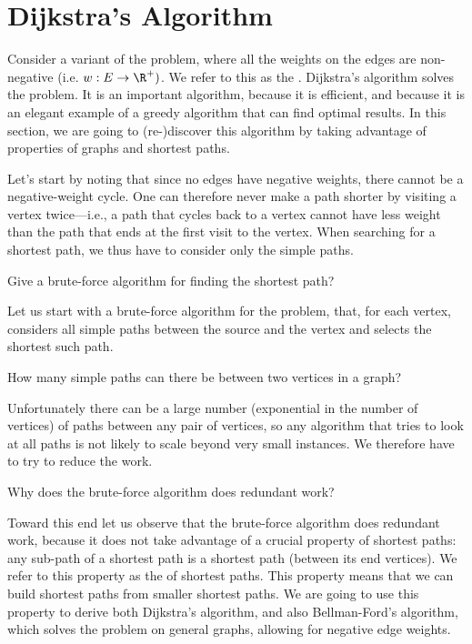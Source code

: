 \section{Dijkstra's Algorithm}

Consider a variant of the \sssp{} problem, where all the weights on
the edges are non-negative (i.e. $w : E \to \R^+)$.  We refer to this
as the . 
%
Dijkstra's algorithm solves the \ssspp{} problem.  It is an important
algorithm, because it is efficient, and because it is an elegant
example of a greedy algorithm that can find optimal results.
%
In this section, we are going to (re-)discover this algorithm by
taking advantage of properties of graphs and shortest paths.  

Let's start by noting that since no edges have negative weights, there
cannot be a negative-weight cycle.  
%
One can therefore never make a path shorter by visiting a vertex
twice---i.e., a path that cycles back to a vertex cannot have less
weight than the path that ends at the first visit to the vertex. 
%
When searching for a shortest path, we thus have to consider only the
simple paths.

\begin{question}
Give a brute-force algorithm for finding the shortest path?
\end{question}

Let us start with a brute-force algorithm for the \ssspp{} problem,
that, for each vertex, considers all simple paths between the source
and the vertex and selects the shortest such path.
%
\begin{question}
How many simple paths can there be between two vertices in a graph?
\end{question}
%
Unfortunately there can be a large number (exponential in the number
of vertices) of paths between any pair of vertices, so any algorithm that
tries to look at all paths is not likely to scale beyond very small
instances.
%
We therefore have to try to reduce the work. 
%
\begin{question}
Why does the brute-force algorithm does redundant work? 
\end{question}
%
Toward this end let us observe that the brute-force algorithm does
redundant work, because it does not take advantage of a crucial
property of shortest paths: any sub-path of a shortest path is a
shortest path (between its end vertices).
%
We refer to this property as the  of shortest
paths.
%
This property means that we can build shortest paths from smaller
shortest paths.
%
We are going to use this property to derive both Dijkstra's algorithm,
and also Bellman-Ford's algorithm, which solves the \sssp{} problem on
general graphs, allowing for negative edge weights.

